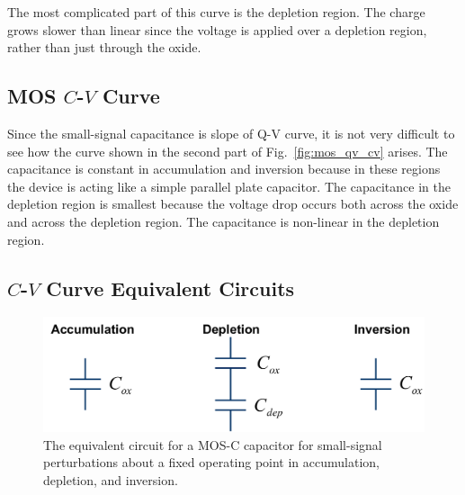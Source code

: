 The most complicated part of this curve is the depletion region.  The charge grows slower than linear since the voltage is applied over a depletion region, rather than just through the oxide.  
\subsection{MOS $C$-$V$ Curve}
Since the small-signal capacitance is slope of Q-V curve, it is not very difficult to see how the curve shown in the second part of Fig.~\ref{fig:mos_qv_cv} arises.  The capacitance is constant in accumulation and inversion because in these regions the device is acting like a simple parallel plate capacitor.  The capacitance in the depletion region is smallest because the voltage drop occurs both across the oxide and across the depletion region.  The capacitance is non-linear in the depletion region.  
\subsection{$C$-$V$ Curve Equivalent Circuits}
\begin{figure}[tbh]
\begin{center}
\includegraphics[width=.85\columnwidth]{mos_cv_circuits}
\end{center}
\caption{The equivalent circuit for a MOS-C capacitor for small-signal perturbations about a fixed operating point in accumulation, depletion, and inversion.}
\label{fig:mos_cv_circuits}
\end{figure}

